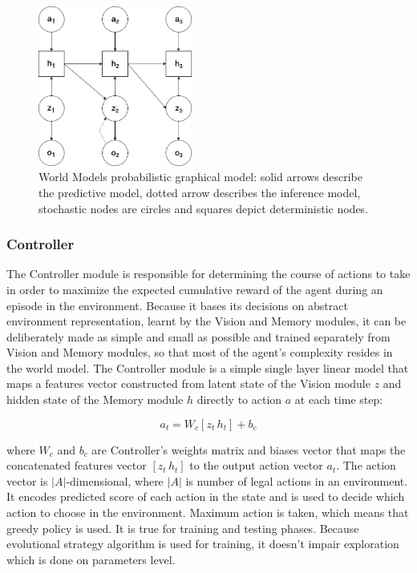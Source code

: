 \begin{figure}[H]
\includegraphics[width=0.45\textwidth,keepaspectratio]{figures/WorldModels/prob_graph_model.png}
\caption[World Models probabilistic graphical model]{World Models probabilistic graphical model: solid arrows describe the predictive model, dotted arrow describes the inference model, stochastic nodes are circles and squares depict deterministic nodes.}
\label{Fig.WorldModelsPGM}
\end{figure}

\subsubsection{Controller}

The Controller module is responsible for determining the course of actions to take in order to maximize the expected cumulative reward of the agent during an episode in the environment. Because it bases its decisions on abstract environment representation, learnt by the Vision and Memory modules, it can be deliberately made as simple and small as possible and trained separately from Vision and Memory modules, so that most of the agent’s complexity resides in the world model. The Controller module is a simple single layer linear model that maps a features vector constructed from latent state of the Vision module $z$ and hidden state of the Memory module $h$ directly to action $a$ at each time step:

$$a_t = W_c[z_t\,h_t] + b_c$$

where $W_c$ and $b_c$ are Controller's weights matrix and biases vector that maps the concatenated features vector $[z_t\,h_t]$ to the output action vector $a_t$. The action vector is $|A|$-dimensional, where $|A|$ is number of legal actions in an environment. It encodes predicted score of each action in the state and is used to decide which action to choose in the environment. Maximum action is taken, which means that greedy policy is used. It is true for training and testing phases. Because evolutional strategy algorithm is used for training, it doesn't impair exploration which is done on parameters level.

